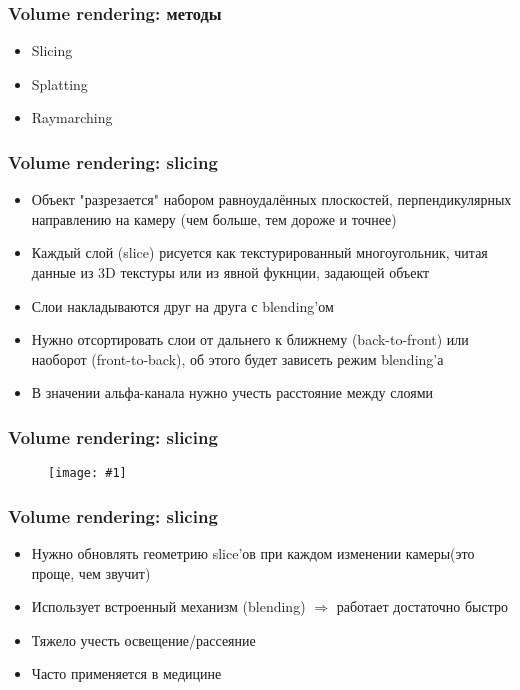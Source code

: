 \documentclass{beamer}
\newcommand{\slideimage}[1]{
  \begin{figure}
    \begin{adjustbox}{width=\textwidth, totalheight=\textheight-2\baselineskip-2\baselineskip,keepaspectratio}
      \texttt{[image: \#1]}
    \end{adjustbox}
  \end{figure}
}
\begin{document}
\begin{frame}[fragile]
\frametitle{Volume rendering: методы}
\begin{itemize}
\item Slicing
\item Splatting
\item Raymarching
\end{itemize}
\end{frame}

\begin{frame}[fragile]
\frametitle{Volume rendering: slicing}
\begin{itemize}
\item Объект "разрезается" набором равноудалённых плоскостей, перпендикулярных направлению на камеру (чем больше, тем дороже и точнее)
\pause
\item Каждый слой (slice) рисуется как текстурированный многоугольник, читая данные из 3D текстуры или из явной фукнции, задающей объект
\pause
\item Слои накладываются друг на друга с blending'ом
\pause
\item Нужно отсортировать слои от дальнего к ближнему (back-to-front) или наоборот (front-to-back), об этого будет зависеть режим blending'а
\pause
\item В значении альфа-канала нужно учесть расстояние между слоями
\end{itemize}
\end{frame}

\begin{frame}[fragile]
\frametitle{Volume rendering: slicing}
\slideimage{slicing.jpg}
\end{frame}

\begin{frame}[fragile]
\frametitle{Volume rendering: slicing}
\begin{itemize}
\item Нужно обновлять геометрию slice'ов при каждом изменении камеры\pause (это проще, чем звучит)
\pause
\item Использует встроенный механизм (blending) \begin{math}\Rightarrow\end{math} работает достаточно быстро
\pause
\item Тяжело учесть освещение/рассеяние
\pause
\item Часто применяется в медицине
\end{itemize}
\end{frame}
\end{document}
